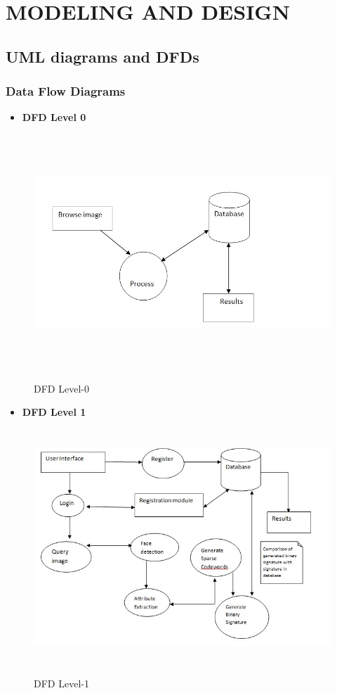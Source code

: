 
\chapter{MODELING AND DESIGN}
\section{\normalsize{\textbf{UML diagrams and DFDs}}}
\subsection{\normalsize{\textbf{Data Flow Diagrams}}}
\begin{itemize}
\item \textbf {DFD Level 0}
\end{itemize}
\begin{figure}[ht!]
	\centering
\includegraphics[height=250pt,width=435pt]{dfd0.jpg}\\
\caption{DFD Level-0}
\end{figure}
\newpage
\begin{itemize}
\item \textbf {DFD Level 1}
\end{itemize}
\begin{figure}[ht!]
	\centering
\includegraphics[height=250pt,width=435pt]{dfd1.jpg}\\
\caption{DFD Level-1}
\end{figure}
